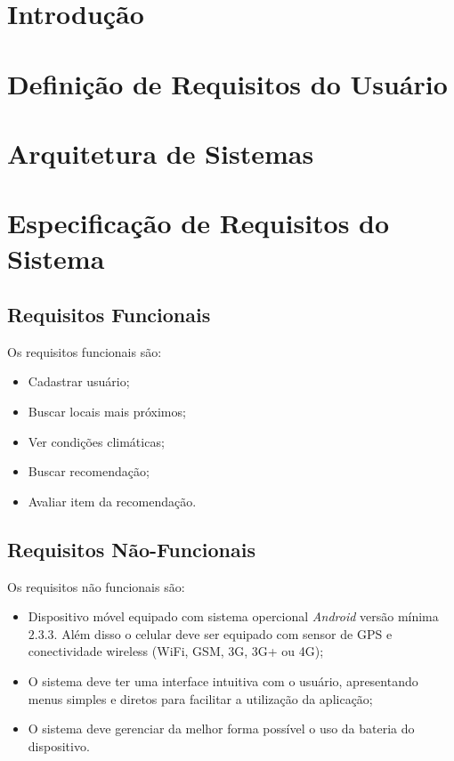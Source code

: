 \documentclass[11pt,a4paper,oneside]{article}
\begin{document}
\section{Introdução}

\section{Definição de Requisitos do Usuário}

\section{Arquitetura de Sistemas}

\section{Especificação de Requisitos do Sistema}

\subsection{Requisitos Funcionais}
Os requisitos funcionais são:
\begin{itemize}
\item Cadastrar usuário;
\item Buscar locais mais próximos;
\item Ver condições climáticas;
\item Buscar recomendação;
\item Avaliar item da recomendação.
\end{itemize}

\subsection{Requisitos Não-Funcionais}
Os requisitos não funcionais são:
\begin{itemize}
\item Dispositivo móvel equipado com sistema opercional \emph{Android} versão mínima $2.3.3$. Além disso o celular deve ser equipado com sensor de GPS e conectividade wireless (WiFi, GSM, 3G, 3G+ ou 4G);
\item O sistema deve ter uma interface intuitiva com o usuário, apresentando menus simples e diretos para facilitar a utilização da aplicação;
\item O sistema deve gerenciar da melhor forma possível o uso da bateria do dispositivo.
\end{itemize}
\end{document}
